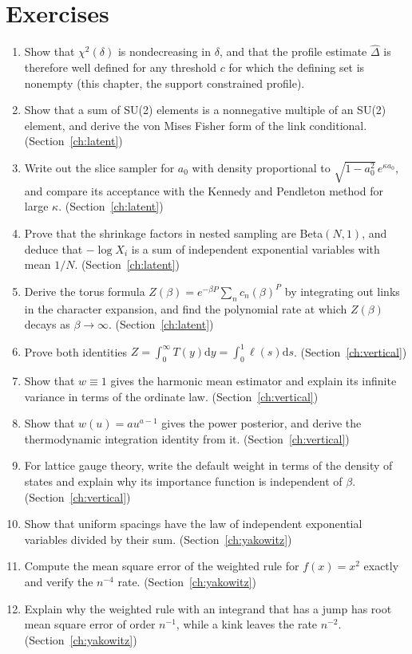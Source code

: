 \section*{Exercises}
\begin{enumerate}
\item Show that $\chi^2(\delta)$ is nondecreasing in $\delta$, and that the profile estimate $\hat\Delta$ is therefore well defined for any threshold $c$ for which the defining set is nonempty (this chapter, the support constrained profile).
\item Show that a sum of SU(2) elements is a nonnegative multiple of an SU(2) element, and derive the von Mises Fisher form of the link conditional. (Section~\ref{ch:latent})
\item Write out the slice sampler for $a_0$ with density proportional to $\sqrt{1-a_0^2}\,e^{\kappa a_0}$, and compare its acceptance with the Kennedy and Pendleton method for large $\kappa$. (Section~\ref{ch:latent})
\item Prove that the shrinkage factors in nested sampling are Beta$(N,1)$, and deduce that $-\log X_i$ is a sum of independent exponential variables with mean $1/N$. (Section~\ref{ch:latent})
\item Derive the torus formula $Z(\beta)=e^{-\beta P}\sum_nc_n(\beta)^P$ by integrating out links in the character expansion, and find the polynomial rate at which $Z(\beta)$ decays as $\beta\to\infty$. (Section~\ref{ch:latent})
\item Prove both identities $Z=\int_0^\infty T(y)\mathrm dy=\int_0^1\ell(s)\mathrm ds$. (Section~\ref{ch:vertical})
\item Show that $w\equiv1$ gives the harmonic mean estimator and explain its infinite variance in terms of the ordinate law. (Section~\ref{ch:vertical})
\item Show that $w(u)=au^{a-1}$ gives the power posterior, and derive the thermodynamic integration identity from it. (Section~\ref{ch:vertical})
\item For lattice gauge theory, write the default weight in terms of the density of states and explain why its importance function is independent of $\beta$. (Section~\ref{ch:vertical})
\item Show that uniform spacings have the law of independent exponential variables divided by their sum. (Section~\ref{ch:yakowitz})
\item Compute the mean square error of the weighted rule for $f(x)=x^2$ exactly and verify the $n^{-4}$ rate. (Section~\ref{ch:yakowitz})
\item Explain why the weighted rule with an integrand that has a jump has root mean square error of order $n^{-1}$, while a kink leaves the rate $n^{-2}$. (Section~\ref{ch:yakowitz})
\end{enumerate}

